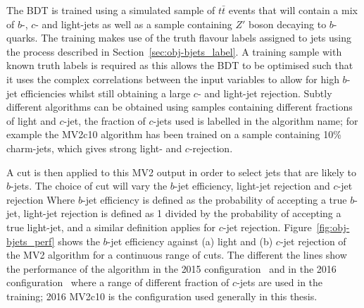 The BDT is trained using a simulated sample of $t\bar{t}$ events that will contain a mix of  $b$-, $c$- and light-jets
as well as a sample containing $Z'$ boson decaying to $b$-quarks.
The training makes use of the truth flavour labels assigned to jets using the process described in Section~\ref{sec:obj-bjets_label}.
A training sample with known truth labels is required as this allows the BDT to be optimised
such that it uses the complex correlations between the input variables to allow for high $b$-jet efficiencies
whilst still obtaining a large $c$- and light-jet rejection.
Subtly different algorithms can be obtained using samples containing different fractions of light and $c$-jet,
the fraction of $c$-jets used is labelled in the algorithm name;
for example the MV2c10 algorithm has been trained on a sample containing 10\% charm-jets, which gives strong light- and $c$-rejection.

A cut is then applied to this MV2 output in order to select jets that are likely to $b$-jets.
The choice of cut will vary the $b$-jet efficiency, light-jet rejection and $c$-jet rejection
Where $b$-jet efficiency is defined as the probability of accepting a true $b$-jet,
light-jet rejection is defined as 1 divided by the probability of accepting a true light-jet, and a similar definition applies for $c$-jet rejection.
Figure~\ref{fig:obj-bjets_perf} shows the $b$-jet efficiency against (a) light and (b) $c$-jet rejection of the MV2 algorithm for a continuous range of cuts.
The different the lines show the performance of the algorithm in the 2015 configuration~\cite{obj-bjets_algo_2015}
and in the 2016 configuration~\cite{obj-bjets_algo_2016} where a range of different fraction of $c$-jets are used in the training;
2016 MV2c10 is the configuration used generally in this thesis.
    
